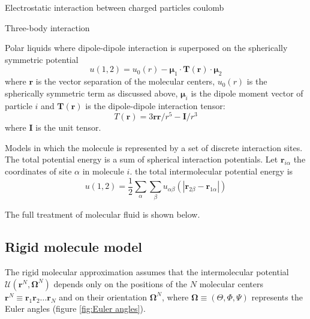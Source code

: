 Electrostatic interaction between charged particles coulomb

Three-body interaction

Polar liquids where dipole-dipole interaction is superposed on the
spherically symmetric potential
\begin{equation}
u(1,2)=u_{0}(r)-\boldsymbol{\mu}_{1}\cdot\mathbf{T}(\mathbf{r})\cdot\boldsymbol{\mu}_{2}
\end{equation}
where $\mathbf{r}$ is the vector separation of the molecular centers,
$u_{0}(r)$ is the spherically symmetric term as discussed above,
$\boldsymbol{\mu}_{i}$ is the dipole moment vector of particle $i$
and $\mathbf{T}(\mathbf{r})$ is the dipole-dipole interaction tensor:
\begin{equation}
T(\mathbf{r})=3\mathbf{r}\mathbf{r}/r^{5}-\mathbf{I}/r^{3}
\end{equation}
where $\mathbf{I}$ is the unit tensor.

Models in which the molecule is represented by a set of discrete interaction
sites. The total potential energy is a sum of spherical interaction
potentials. Let $\mathbf{r}_{i\alpha}$ the coordinates of site $\alpha$
in molecule $i$. the total intermolecular potential energy is
\begin{equation}
u(1,2)=\frac{1}{2}\sum_{\alpha}\sum_{\beta}u_{\alpha\beta}(\left|\mathbf{r}_{2\beta}-\mathbf{r}_{1\alpha}\right|)
\end{equation}


The full treatment of molecular fluid is shown below.


\subsection{Rigid molecule model}

The rigid molecular approximation assumes that the intermolecular
potential $\mathcal{U}(\mathbf{r}^{N},\mathbf{\Omega}^{N})$ depends
only on the positions of the $N$ molecular centers $\mathbf{r}^{N}\equiv\mathbf{r}_{1}\mathbf{r}_{2}\ldots\mathbf{r}_{N}$
and on their orientation $\mathbf{\Omega}^{N}$, where $\mathbf{\Omega}\equiv(\Theta,\Phi,\Psi)$
represents the Euler angles (figure \ref{fig:Euler angles}).

